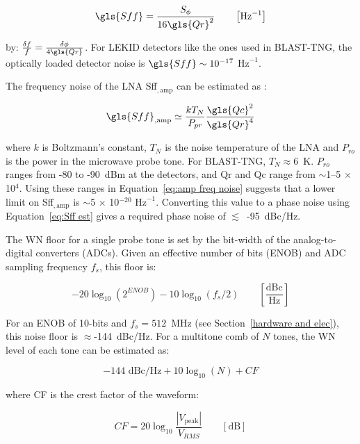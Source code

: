 \begin{equation}\label{eq:Sff est}
  \gls{Sff} = \frac{S_{\phi}}{16 \gls{Qr}^{2}} \qquad \left[ \mathrm{Hz}^{-1} \right]
\end{equation}

by: $\frac{\delta f}{f} = \frac{\delta \phi}{4 \gls{Qr}}$. For LEKID detectors like the ones used in BLAST-TNG, the optically loaded detector noise is $\gls{Sff} \sim 10^{-17}$ $\mathrm{Hz}^{-1}$.

The frequency noise of the LNA \gls{Sff}$_{,\mathrm{amp}}$ can be estimated as \citep{barry2014development}:

\begin{equation}\label{eq:amp freq noise}
  \gls{Sff}_{,\mathrm{amp}} \simeq \frac{kT_{N}}{P_{pr}}\frac{\gls{Qc}^{2}}{\gls{Qr}^{4}}
\end{equation}

where $k$ is Boltzmann's constant, $T_{N}$ is the noise temperature of the LNA and $P_{ro}$ is the power in the microwave probe tone. For BLAST-TNG, $T_{N} \approx 6$~K. $P_{ro}$ ranges from -80 to -90~dBm at the detectors, and \gls{Qr} and \gls{Qc} range from $\sim$1--5 $\times$ 10$^{4}$. Using these ranges in Equation~\ref{eq:amp freq noise} suggests that a lower limit on \gls{Sff}$_{,\mathrm{amp}}$ is $\sim$5 $\times$ 10$^{-20}$ $\mathrm{Hz}^{-1}$. Converting this value to a phase noise using Equation~\ref{eq:Sff est} gives a required phase noise of $\lesssim$~-95~dBc/Hz.

The WN floor for a single probe tone is set by the bit-width of the analog-to-digital converters (ADCs). Given an effective number of bits (ENOB) and ADC sampling frequency $f_{s}$, this floor is:

\begin{equation}
-20\log_{10}(2^{ENOB})- 10\log_{10}(f_{s}/2) \qquad \left[ \frac{\mathrm{dBc}}{\mathrm{Hz}} \right]
\end{equation}

For an ENOB of 10-bits and $f_{s} = 512$~MHz (see Section~\ref{hardware and elec}), this noise floor is $\approx$-144~dBc/Hz. For a multitone comb of $N$ tones, the WN level of each tone can be estimated as:

\begin{equation}\label{eq:whitenoise}
-144 \textrm{ dBc/Hz} + 10\log_{10}(N) + CF
\end{equation}

where CF is the crest factor of the waveform:

\begin{equation}
  CF = 20\log_{10}\frac{ |V_{\mathrm{peak}}|}{V_{RMS}} \qquad [\mathrm{dB}]
\end{equation}

